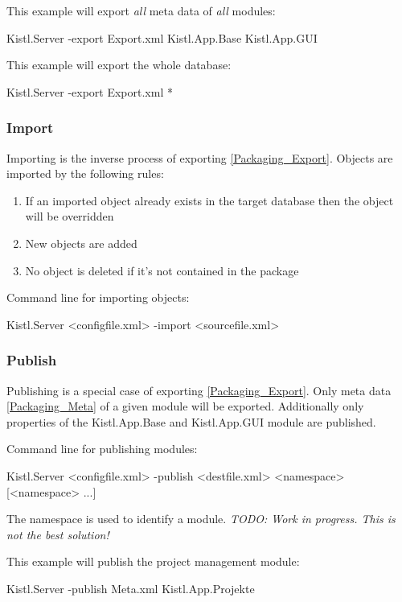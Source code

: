 This example will export \emph{all} meta data of \emph{all} modules:
\begin{CS}
Kistl.Server -export Export.xml Kistl.App.Base Kistl.App.GUI
\end{CS}

This example will export the whole database:
\begin{CS}
Kistl.Server -export Export.xml *
\end{CS}

\subsubsection{\label{Packaging_Import}Import}

Importing is the inverse process of exporting \ref{Packaging_Export}. Objects are imported by the following rules:

\begin{enumerate}
 \item If an imported object already exists in the target database then the object will be overridden
 \item New objects are added
 \item No object is deleted if it's not contained in the package
\end{enumerate}

Command line for importing objects:
\begin{CS}
Kistl.Server <configfile.xml> -import <sourcefile.xml>
\end{CS}

\subsubsection{\label{Packaging_Publish}Publish}

Publishing is a special case of exporting \ref{Packaging_Export}. Only meta data \ref{Packaging_Meta} of a given module will be exported. 
Additionally only properties of the Kistl.App.Base and Kistl.App.GUI module are published.

Command line for publishing modules:
\begin{CS}
Kistl.Server <configfile.xml> -publish <destfile.xml> <namespace> [<namespace> ...]
\end{CS}

The namespace is used to identify a module. \emph{TODO: Work in progress. This is not the best solution!}
\par

This example will publish the project management module:
\begin{CS}
Kistl.Server -publish Meta.xml Kistl.App.Projekte
\end{CS}

